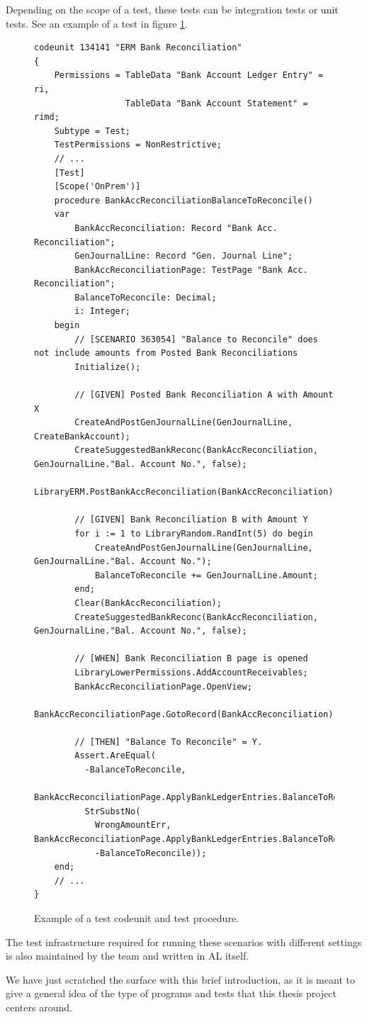 Depending on the scope of a test, these tests can be integration tests or unit tests. See
an example of a test in figure \ref{f:app-al-test}.

\begin{figure}
    \begin{Verbatim}[fontsize=\tiny]
codeunit 134141 "ERM Bank Reconciliation"
{
    Permissions = TableData "Bank Account Ledger Entry" = ri,
                  TableData "Bank Account Statement" = rimd;
    Subtype = Test;
    TestPermissions = NonRestrictive;
    // ...
    [Test]
    [Scope('OnPrem')]
    procedure BankAccReconciliationBalanceToReconcile()
    var
        BankAccReconciliation: Record "Bank Acc. Reconciliation";
        GenJournalLine: Record "Gen. Journal Line";
        BankAccReconciliationPage: TestPage "Bank Acc. Reconciliation";
        BalanceToReconcile: Decimal;
        i: Integer;
    begin
        // [SCENARIO 363054] "Balance to Reconcile" does not include amounts from Posted Bank Reconciliations
        Initialize();

        // [GIVEN] Posted Bank Reconciliation A with Amount X
        CreateAndPostGenJournalLine(GenJournalLine, CreateBankAccount);
        CreateSuggestedBankReconc(BankAccReconciliation, GenJournalLine."Bal. Account No.", false);
        LibraryERM.PostBankAccReconciliation(BankAccReconciliation);

        // [GIVEN] Bank Reconciliation B with Amount Y
        for i := 1 to LibraryRandom.RandInt(5) do begin
            CreateAndPostGenJournalLine(GenJournalLine, GenJournalLine."Bal. Account No.");
            BalanceToReconcile += GenJournalLine.Amount;
        end;
        Clear(BankAccReconciliation);
        CreateSuggestedBankReconc(BankAccReconciliation, GenJournalLine."Bal. Account No.", false);

        // [WHEN] Bank Reconciliation B page is opened
        LibraryLowerPermissions.AddAccountReceivables;
        BankAccReconciliationPage.OpenView;
        BankAccReconciliationPage.GotoRecord(BankAccReconciliation);

        // [THEN] "Balance To Reconcile" = Y.
        Assert.AreEqual(
          -BalanceToReconcile,
          BankAccReconciliationPage.ApplyBankLedgerEntries.BalanceToReconcile.AsDEcimal,
          StrSubstNo(
            WrongAmountErr, BankAccReconciliationPage.ApplyBankLedgerEntries.BalanceToReconcile.Caption,
            -BalanceToReconcile));
    end;
    // ...
}
    \end{Verbatim}
    \caption{Example of a test codeunit and test procedure.}
    \label{f:app-al-test}
\end{figure}

The test infrastructure required for running these scenarios with different settings is also maintained
by the team and written in AL itself. 

We have just scratched the surface with this brief introduction, as it is meant to give a general idea of the
type of programs and tests that this thesis project centers around.